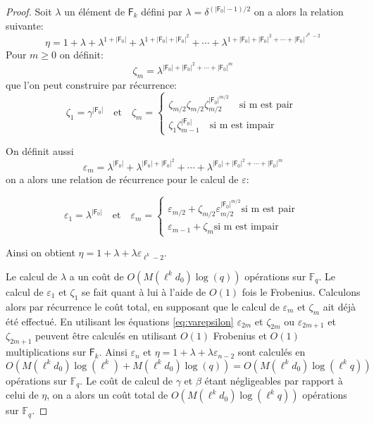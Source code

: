 \documentclass[10pt,a4paper]{book}
\theoremstyle{plain}
\theoremstyle{definition}
\theoremstyle{definition}
\theoremstyle{definition}
\theoremstyle{definition}
\theoremstyle{remark}
\theoremstyle{remark}
\begin{document}
\begin{proof}
Soit $\lambda$ un élément de $\mathsf{F}_k$ défini par $\lambda = \delta^{(|\mathsf{F}_0|-1)/2} $ on a alors la relation suivante:
\begin{equation*}
\eta = 1 + \lambda + \lambda^{1+|\mathsf{F}_0|} + \lambda^{1+|\mathsf{F}_0|+|\mathsf{F}_0|^{2}} + \cdots + \lambda^{1+|\mathsf{F}_0|+|\mathsf{F}_0|^{2}+\cdots+|\mathsf{F}_0|^{\ell^k-2}} 
\end{equation*}
Pour $m \geqslant 0$ on définit:
\begin{equation}
\zeta_m=\lambda^{|\mathsf{F}_0|+|\mathsf{F}_0|^2+\cdots+|\mathsf{F}_0|^{m}} 
\end{equation}
que l'on peut construire par récurrence:
\begin{equation*}
\zeta_1=\gamma^{|\mathsf{F}_0|} \quad \text{et} \quad
\zeta_m=
\begin{cases} 
\zeta_{m/2}  \zeta_{m/2}\zeta_{m/2}^{|\mathsf{F}_0|^{m/2}} \quad \text{si m est pair }\\
\zeta_{1}  \zeta_{m-1}^{|\mathsf{F}_0|} \quad \text{si m est impair}
\end{cases}
\end{equation*}

On définit aussi
\begin{equation*}
\varepsilon_m=\lambda^{|\mathsf{F}_0|} + \lambda^{|\mathsf{F}_0|+|\mathsf{F}_0|^{2}} + \cdots + \lambda^{|\mathsf{F}_0|+|\mathsf{F}_0|^{2}+\cdots+|\mathsf{F}_0|^{m}}
\end{equation*} 
on a alors une relation de récurrence pour le calcul de $\varepsilon$:

\begin{equation}
\label{eq:varepsilon}
\varepsilon_1=\lambda^{|\mathsf{F}_0|} \quad \text{et} \quad
\varepsilon_m=
\begin{cases} 
\varepsilon_{m/2} + \zeta_{m/2}\varepsilon_{m/2}^{|\mathsf{F}_0|^{m/2}} \text{si m est pair }\\
\varepsilon_{m-1} + \zeta_{m} \text{si m est impair}
\end{cases}
\end{equation}

Ainsi on obtient $\eta=1+\lambda+\lambda \varepsilon_{\ell^k-2}$. 

 
Le calcul de $\lambda$ a un coût de $O(M(\ell^kd_0)\log(q))$ opérations sur $\mathbb{F}_q$. Le calcul de $\varepsilon_1$ et $\zeta_1$ se fait quant à lui à l'aide de $O(1)$ fois le Frobenius. Calculons alors par récurrence le coût total, en supposant que le calcul de $\varepsilon_m$ et $\zeta_m$ ait déjà été effectué. En utilisant les équations \eqref{eq:varepsilon} $\varepsilon_{2m}$ et $\zeta_{2m}$ ou $\varepsilon_{2m+1}$ et $\zeta_{2m+1}$ peuvent être calculés en utilisant $O(1)$ Frobenius et $O(1)$ multiplications sur $\mathsf{F}_{k}$. Ainsi $\varepsilon_n$ et $\eta=1+\lambda+\lambda\varepsilon_{n-2}$ sont calculés en $O(M(\ell^kd_0)\log(\ell^k)+M(\ell^kd_0)\log(q))=O(M(\ell^kd_0)\log(\ell^kq))$ opérations sur $\mathbb{F}_q$.
Le coût de calcul de $\gamma$ et $\beta$ étant négligeables par rapport à celui de $\eta$, on a alors un coût total de $O(M(\ell^kd_0)\log(\ell^kq))$ opérations sur $\mathbb{F}_q$.

\end{proof}
\end{document}
